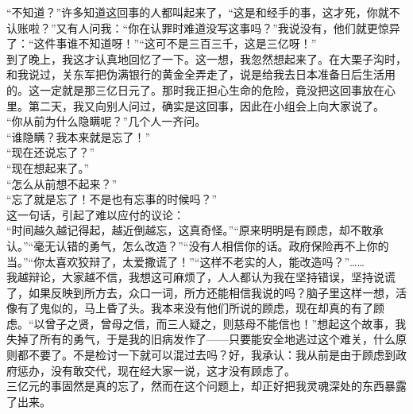 “不知道？”许多知道这回事的人都叫起来了，“这是和经手的事，这才死，你就不认账啦？”又有人问我：“你在认罪时难道没写这事吗？”我说没有，他们就更惊异了：“这件事谁不知道呀！”“这可不是三百三千，这是三亿呀！”\\

到了晚上，我这才认真地回忆了一下。这一想，我忽然想起来了。在大栗子沟时，和我说过，关东军把伪满银行的黄金全弄走了，说是给我去日本准备日后生活用的。这一定就是那三亿日元了。那时我正担心生命的危险，竟没把这回事放在心里。第二天，我又向别人问过，确实是这回事，因此在小组会上向大家说了。\\

“你从前为什么隐瞒呢？”几个人一齐问。\\

“谁隐瞒？我本来就是忘了！”\\

“现在还说忘了？”\\

“现在想起来了。”\\

“怎么从前想不起来？”\\

“忘了就是忘了！不是也有忘事的时候吗？”\\

这一句话，引起了难以应付的议论：\\

“时间越久越记得起，越近倒越忘，这真奇怪。”“原来明明是有顾虑，却不敢承认。”“毫无认错的勇气，怎么改造？”“没有人相信你的话。政府保险再不上你的当。”“你太喜欢狡辩了，太爱撒谎了！”“这样不老实的人，能改造吗？”……\\

我越辩论，大家越不信，我想这可麻烦了，人人都认为我在坚持错误，坚持说谎了，如果反映到所方去，众口一词，所方还能相信我说的吗？脑子里这样一想，活像有了鬼似的，马上昏了头。我本来没有他们所说的顾虑，现在却真的有了顾虑。“以曾子之贤，曾母之信，而三人疑之，则慈母不能信也！”想起这个故事，我失掉了所有的勇气，于是我的旧病发作了——只要能安全地逃过这个难关，什么原则都不要了。不是检讨一下就可以混过去吗？好，我承认：我从前是由于顾虑到政府惩办，没有敢交代，现在经大家一说，这才没有顾虑了。\\

三亿元的事固然是真的忘了，然而在这个问题上，却正好把我灵魂深处的东西暴露了出来。\\

